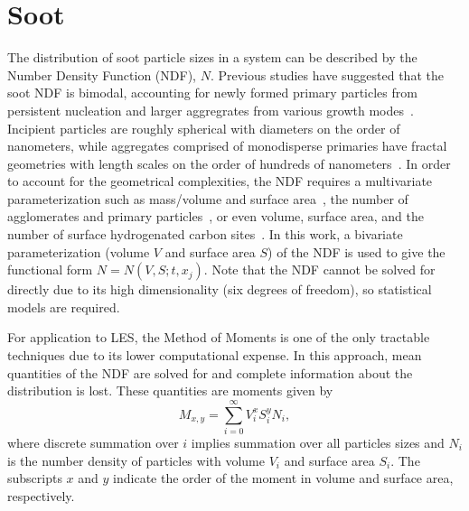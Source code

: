 \section{Soot}
\label{sec:lesmodels:soot}


The distribution of soot particle sizes in a system can be described by the Number Density Function (NDF), $N$. Previous studies have suggested that the soot NDF is bimodal, accounting for newly formed primary particles from persistent nucleation and larger aggregrates from various growth modes~\cite{zhao2003,zhao2005,netzell2007}. Incipient particles are roughly spherical with diameters on the order of nanometers, while aggregates comprised of monodisperse primaries have fractal geometries with length scales on the order of hundreds of nanometers~\cite{vanderwal1999}. In order to account for the geometrical complexities, the NDF requires a multivariate parameterization such as mass/volume and surface area~\cite{patterson2007,mueller2009,hmom2009}, the number of agglomerates and primary particles~\cite{park2004}, or even volume, surface area, and the number of surface hydrogenated carbon sites~\cite{blanquart2009}. In this work, a bivariate parameterization (volume $V$ and surface area $S$) of the NDF is used to give the functional form $N = N(V, S; t, x_j)$. Note that the NDF cannot be solved for directly due to its high dimensionality (six degrees of freedom), so statistical models are required.

For application to LES, the Method of Moments is one of the only tractable techniques due to its lower computational expense. In this approach, mean quantities of the NDF are solved for and complete information about the distribution is lost. These quantities are moments given by
\begin{equation}\label{eq:lesmodels:soot:ndf:moments}
  M_{x,y} = \sum\limits_{i=0}^\infty V_i^x S_i^y N_i,
\end{equation}
where discrete summation over $i$ implies summation over all particles sizes and $N_i$ is the number density of particles with volume $V_i$ and surface area $S_i$. The subscripts $x$ and $y$ indicate the order of the moment in volume and surface area, respectively.

